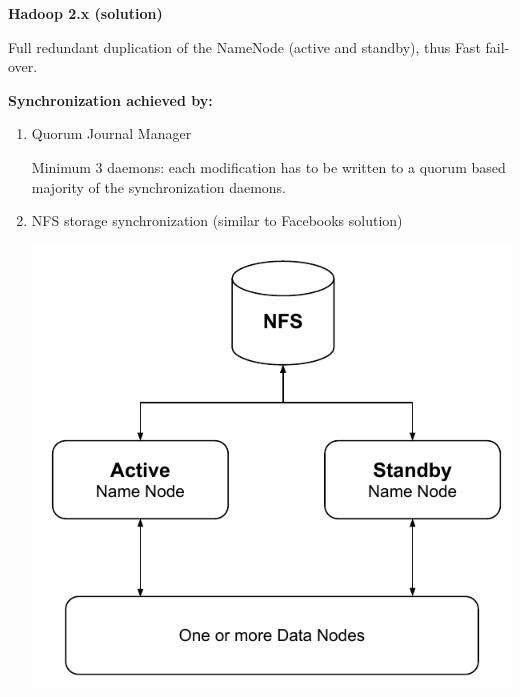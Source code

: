 \documentclass[paper=128mm:96mm, fontsize=11pt, pagesize, parskip=half-,]{scrartcl}
\theoremstyle{definition}
\newenvironment{Figure}
  {\par\medskip\noindent\minipage{\linewidth}}
  {\endminipage\par\medskip}
\newcommand*{\centerinpage}[1]{
	\null \vfill
	\begin{Figure}
		\centering	
		#1	
	\end{Figure}
	\vfill \null}
\newcommand*{\newslide}{\clearpage}
\begin{document}
\textbf{Hadoop 2.x (solution)}
\begin{multicols}{2}
Full redundant duplication of the NameNode (active and standby), thus Fast fail-over.
\vspace*{2mm}

\textbf{Synchronization achieved by:}
\begin{enumerate}
	\item Quorum Journal Manager
	
	Minimum 3 daemons: each modification has to be written to a quorum based majority of the synchronization daemons.
	\vfill \null
	\columnbreak
	
	\item NFS storage synchronization (similar to Facebooks solution)
	\centerinpage{
		\begin{Figure}
			\centering\includegraphics[scale=0.42]{../Report/pdf/hadoop-2x-nfs.pdf}
		\end{Figure}
	}
\end{enumerate}

\end{multicols}

\newslide
\end{document}
